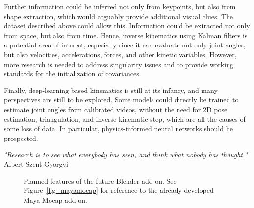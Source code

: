 Further information could be inferred not only from keypoints, but also from shape extraction, which would arguably provide additional visual clues. The dataset described above could allow this. Information could be extracted not only from space, but also from time. Hence, inverse kinematics using Kalman filters is a potential area of interest, especially since it can evaluate not only joint angles, but also velocities, accelerations, forces, and other kinetic variables. However, more research is needed to address singularity issues and to provide working standards for the initialization of covariances.

Finally, deep-learning based kinematics is still at its infancy, and many perspectives are still to be explored. Some models could directly be trained to estimate joint angles from calibrated videos, without the need for 2D pose estimation, triangulation, and inverse kinematic step, which are all the causes of some loss of data. In particular, physics-informed neural networks should be prospected.



\vspace*{\fill}
\begin{flushright}
\textit{"Research is to see what everybody has seen, and think what nobody has thought."} \\
Albert Szent-Gyorgyi
\end{flushright}


\begin{figure}[hbtp]
      \centering
      \caption{Planned features of the future Blender add-on. See Figure~\ref{fig_mayamocap} for reference to the already developed Maya-Mocap add-on.}
      \label{fig_blendermocap}
\end{figure}




